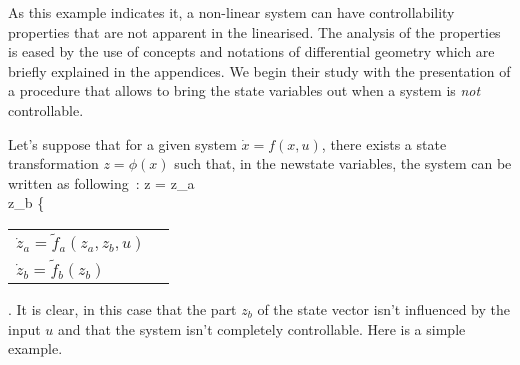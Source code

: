 As this example indicates it, a non-linear system can have controllability properties that are not apparent in the linearised. The analysis of the properties is eased by the use of concepts and notations of differential geometry which are briefly explained in the appendices. We begin their study with the presentation of a procedure that allows to bring the state variables out when a system is {\textit{not}} controllable.

Let's suppose that for a given system $\dot x = f(x,u)$, there exists a state transformation $z = \phi(x)$ such that, in the newstate variables, the system can be written as following~:
\eqnn
z =  z_a \\ z_b \ema \hu 
\left \{
\begin{tabular}{ll}
$\dot z_a = \tilde f_a(z_a, z_b, u)$ \\
$\dot z_b = \tilde f_b(z_b)$ 
\end{tabular}
\right.
\eeqnn
It is clear, in this case that the part $z_b$ of the state vector isn't influenced by the input $u$ and that the system isn't completely controllable. Here is a simple example.


